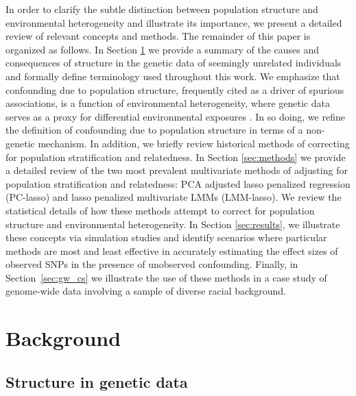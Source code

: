 In order to clarify the subtle distinction between population structure and environmental heterogeneity and illustrate its importance, we present a detailed review of relevant concepts and methods. The remainder of this paper is organized as follows. In Section \ref{sec:background} we provide a summary of the causes and consequences of structure in the genetic data of seemingly unrelated individuals and formally define terminology used throughout this work. We emphasize that confounding due to population structure, frequently cited as a driver of spurious associations, is a function of environmental heterogeneity, where genetic data serves as a proxy for differential environmental exposures \citep{Sillanpaeae2011, sul2018population, vilhjalmsson2012nature, barton2019population}. In so doing, we refine the definition of confounding due to population structure in terms of a non-genetic mechanism. In addition, we briefly review historical methods of correcting for population stratification and relatedness. In Section \ref{sec:methods} we provide a detailed review of the two most prevalent multivariate methods of adjusting for population stratification and relatedness: PCA adjusted lasso penalized regression (PC-lasso) and lasso penalized multivariate LMMs (LMM-lasso). We review the statistical details of how these methods attempt to correct for population structure and environmental heterogeneity. In Section \ref{sec:results}, we illustrate these concepts via simulation studies and identify scenarios where particular methods are most and least effective in accurately estimating the effect sizes of observed SNPs in the presence of unobserved confounding. Finally, in Section~\ref{sec:gw_cs} we illustrate the use of these methods in a case study of genome-wide data involving a sample of diverse racial background.

\section{Background} \label{sec:background}

\subsection{Structure in genetic data}

